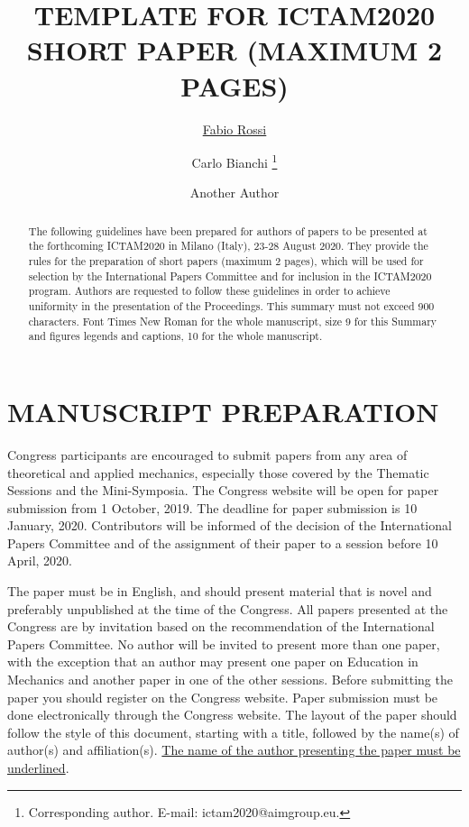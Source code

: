 \documentclass[10pt, a4paper]{article}
\begin{document}
\title{TEMPLATE FOR ICTAM2020 SHORT PAPER (MAXIMUM 2 PAGES)}

\author[1]{\underline{Fabio Rossi}}
\author[1]{{Carlo Bianchi} {\footnote{Corresponding author. E-mail: ictam2020@aimgroup.eu.}}} 
\author[2]{Another Author}

\maketitle

\begin{abstract}
The following guidelines have been prepared for authors of papers to be presented at the forthcoming ICTAM2020 in Milano (Italy), 23-28 August 2020. They provide the rules for the preparation of short papers (maximum 2 pages), which will be used for selection by the International Papers Committee and for inclusion in the ICTAM2020 program. Authors are requested to follow these guidelines in order to achieve uniformity in the presentation of the Proceedings. This summary must not exceed 900 characters. Font Times New Roman for the whole manuscript, size 9 for this Summary and figures legends and captions, 10 for the whole manuscript. 
\end{abstract}

\section{MANUSCRIPT PREPARATION}

Congress participants are encouraged to submit papers from any area of theoretical and applied mechanics, especially those covered by the Thematic Sessions and the Mini-Symposia. The Congress website will be open for paper submission from 1 October, 2019. The deadline for paper submission is 10 January, 2020. Contributors will be informed of the decision of the International Papers Committee and of the assignment of their paper to a session before 10 April, 2020.

The paper must be in English, and should present material that is novel and preferably unpublished at the time of the Congress. All papers presented at the Congress are by invitation based on the recommendation of the International Papers Committee. No author will be invited to present more than one paper, with the exception that an author may present one paper on Education in Mechanics and another paper in one of the other sessions. Before submitting the paper you should register on the Congress website. Paper submission must be done electronically through the Congress website. The layout of the paper should follow the style of this document, starting with a title, followed by the name(s) of author(s) and affiliation(s).  \underline{The name of the author presenting the paper must be underlined}.
\end{document}
